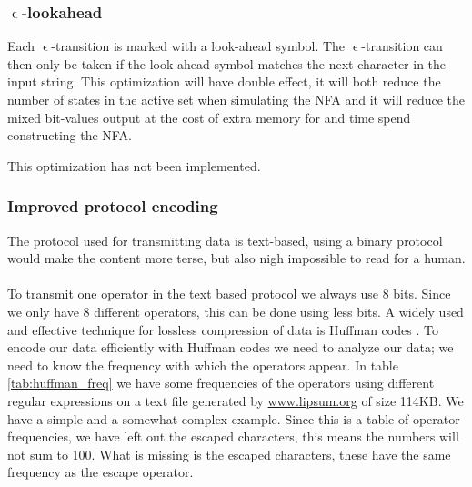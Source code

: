 \subsubsection{$\upvarepsilon$-lookahead}

Each $\upvarepsilon$-transition is marked with a look-ahead
symbol. The $\upvarepsilon$-transition can then only be taken if the
look-ahead symbol matches the next character in the input string. This
optimization will have double effect, it will both reduce the number
of states in the active set when simulating the NFA and it will reduce
the mixed bit-values output at the cost of extra memory for and time
spend constructing the NFA.

This optimization has not been implemented.

\subsubsection{Improved protocol encoding}
The protocol used for transmitting data is text-based, using a binary
protocol would make the content more terse, but also nigh impossible
to read for a human. 

\paragraph{}
To transmit one operator in the text based protocol we always use 8
bits. Since we only have 8 different operators, this can be done using
less bits. A widely used and effective technique for lossless
compression of data is Huffman codes \cite{Cormen}. To encode our data
efficiently with Huffman codes we need to analyze our data; we need to
know the frequency with which the operators appear. In table
\vref{tab:huffman_freq} we have some frequencies of the operators
using different regular expressions on a text file generated by
\url{www.lipsum.org} of size 114KB. We have a simple and a somewhat
complex example. Since this is a table of operator frequencies, we
have left out the escaped characters, this means the numbers will not
sum to 100. What is missing is the escaped characters, these have the
same frequency as the escape operator.


